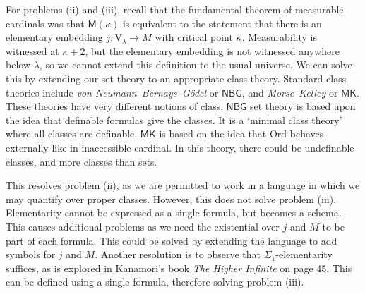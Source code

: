For problems (ii) and (iii), recall that the fundamental theorem of measurable cardinals was that \( \mathsf{M}(\kappa) \) is equivalent to the statement that there is an elementary embedding \( j : \mathrm{V}_\lambda \to M \) with critical point \( \kappa \).
Measurability is witnessed at \( \kappa + 2 \), but the elementary embedding is not witnessed anywhere below \( \lambda \), so we cannot extend this definition to the usual universe.
We can solve this by extending our set theory to an appropriate class theory.
Standard class theories include \emph{von Neumann--Bernays--G\"odel} or \( \mathsf{NBG} \), and \emph{Morse--Kelley} or \( \mathsf{MK} \).
These theories have very different notions of class.
\( \mathsf{NBG} \) set theory is based upon the idea that definable formulas give the classes.
It is a `minimal class theory' where all classes are definable.
\( \mathsf{MK} \) is based on the idea that \( \mathrm{Ord} \) behaves externally like in inaccessible cardinal.
In this theory, there could be undefinable classes, and more classes than sets.

This resolves problem (ii), as we are permitted to work in a language in which we may quantify over proper classes.
However, this does not solve problem (iii).
Elementarity cannot be expressed as a single formula, but becomes a schema.
This causes additional problems as we need the existential over \( j \) and \( M \) to be part of each formula.
This could be solved by extending the language to add symbols for \( j \) and \( M \).
Another resolution is to observe that \( \Sigma_1 \)-elementarity suffices, as is explored in Kanamori's book \emph{The Higher Infinite} on page 45.
This can be defined using a single formula, therefore solving problem (iii).

